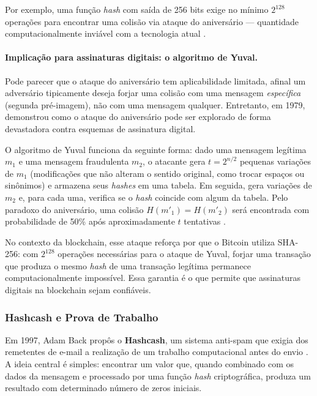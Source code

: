 Por exemplo, uma função \textit{hash} com saída de 256 bits exige no mínimo $2^{128}$ operações para encontrar uma colisão via ataque do aniversário --- quantidade computacionalmente inviável com a tecnologia atual \cite{tomaz2014}.

\paragraph{Implicação para assinaturas digitais: o algoritmo de Yuval.}

Pode parecer que o ataque do aniversário tem aplicabilidade limitada, afinal um adversário tipicamente deseja forjar uma colisão com uma mensagem \textit{específica} (segunda pré-imagem), não com uma mensagem qualquer. Entretanto, em 1979,  demonstrou como o ataque do aniversário pode ser explorado de forma devastadora contra esquemas de assinatura digital.

O algoritmo de Yuval funciona da seguinte forma: dado uma mensagem legítima $m_1$ e uma mensagem fraudulenta $m_2$, o atacante gera $t = 2^{n/2}$ pequenas variações de $m_1$ (modificações que não alteram o sentido original, como trocar espaços ou sinônimos) e armazena seus \textit{hashes} em uma tabela. Em seguida, gera variações de $m_2$ e, para cada uma, verifica se o \textit{hash} coincide com algum da tabela. Pelo paradoxo do aniversário, uma colisão $H(m'_1) = H(m'_2)$ será encontrada com probabilidade de 50\% após aproximadamente $t$ tentativas \cite{yuval1979}.

No contexto da blockchain, esse ataque reforça por que o Bitcoin utiliza SHA-256: com $2^{128}$ operações necessárias para o ataque de Yuval, forjar uma transação que produza o mesmo \textit{hash} de uma transação legítima permanece computacionalmente impossível. Essa garantia é o que permite que assinaturas digitais na blockchain sejam confiáveis.

\subsubsection{Hashcash e Prova de Trabalho}

Em 1997, Adam Back propôs o \textbf{Hashcash}, um sistema anti-spam que exigia dos remetentes de e-mail a realização de um trabalho computacional antes do envio \cite{back2002}. A ideia central é simples: encontrar um valor que, quando combinado com os dados da mensagem e processado por uma função \textit{hash} criptográfica, produza um resultado com determinado número de zeros iniciais.

